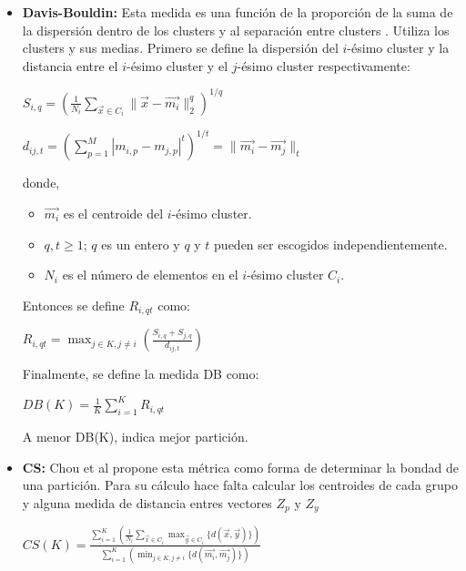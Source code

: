 \begin{itemize}

\item {\bf Davis-Bouldin:}
Esta medida es una función de la proporción de la suma de la dispersión dentro 
de los clusters y al separación entre clusters \cite{DC_5}. Utiliza los clusters y 
sus medias. Primero se define la dispersión del $i$-ésimo cluster y la distancia  
entre el $i$-ésimo cluster y el $j$-ésimo cluster respectivamente:
\begin{center}
$ S_{i,q} = \left( \frac{1}{N_i} \displaystyle\sum_{\overrightarrow{x} \in C_i} \|\overrightarrow{x} - \overrightarrow{m_i}\|_{2}^q\right)^{1/q}$
\end{center}
\begin{center}
$ d_{ij,t} = \left(\displaystyle\sum_{p=1}^{M} | m_{i,p} - m_{j,p} |^t \right)^{1/t} = \|\overrightarrow{m_i} - \overrightarrow{m_j}\|_t$
\end{center}
donde,
\begin{itemize}
    \item $\overrightarrow{m_i}$ es el centroide del $i$-ésimo cluster.
    \item $q,t \geq 1$; $q$ es un entero y $q$ y $t$ pueden ser escogidos
independientemente.
    \item $N_i$ es el número de elementos en el $i$-ésimo cluster $C_i$.
\end{itemize}

    Entonces se define $R_{i,qt}$ como:
\begin{center}
$ R_{i,qt} = \displaystyle\max_{j \in K, j \neq i}\left( \frac{S_{i,q} + S_{j,q}}{d_{ij,t}}\right)$
\end{center}

Finalmente, se define la medida DB como:
\begin{center}
$ DB(K) = \frac{1}{K} \displaystyle\sum_{i = 1}^K R_{i,qt}$
\end{center}

A menor DB(K), indica mejor partición.

\item {\bf CS:} Chou et al \cite{SwAjAm2009} propone esta m\'etrica como forma
de determinar la bondad de una partici\'on. Para su c\'alculo hace falta calcular los centroides
de cada grupo y alguna medida de distancia entres vectores $Z_p$ y $Z_y$

\begin{center}
$ CS(K) = \displaystyle\frac{\displaystyle\sum_{i=1}^K 
                \left(\frac{1}{N_i}\displaystyle\sum_{\overrightarrow{x} \in C_i} \max_{\overrightarrow{y} \in C_i} \{ d(\overrightarrow{x}, \overrightarrow{y})\}\right)}{\displaystyle\sum_{i=1}^K \left(\displaystyle\min_{j \in K, j \neq i} \{ d(\overrightarrow{m_i}, \overrightarrow{m_j})\} \right)}$
\end{center}


\end{itemize}

